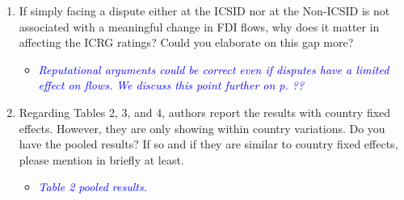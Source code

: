 \begin{enumerate}
\begin{itemize}
{{		}}
	\end{itemize}
	\item If simply facing a dispute either at the ICSID nor at the Non-ICSID is not associated with a meaningful change in FDI flows, why does it matter in affecting the ICRG ratings? Could you elaborate on this gap more?	
	\begin{itemize}
		\item \textcolor{blue}{ \emph{
		Reputational arguments could be correct even if disputes have a limited effect on flows. We discuss this point further on p. ??
		}}
	\end{itemize}
	\item Regarding Tables 2, 3, and 4, authors report the results with country fixed effects. However, they are only showing within country variations. Do you have the pooled results? If so and if they are similar to country fixed effects, please mention in briefly at least.
	\begin{itemize}
		\item \textcolor{blue}{ \emph{ Table 2 pooled results. }}


\end{itemize}
\end{enumerate}
